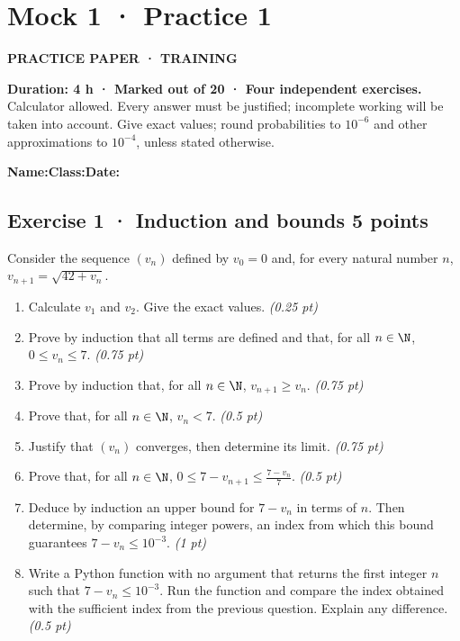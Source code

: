 \clearpage{}\label{sujet:5-1}

\section*{Mock 1 · Practice 1}

{\sffamily\bfseries\color{teal}PRACTICE PAPER · TRAINING\par}

\textbf{Duration: 4 h · Marked out of 20 · Four independent exercises.}\\Calculator allowed. Every answer must be justified; incomplete working will be taken into account. Give exact values; round probabilities to $10^{-6}$ and other approximations to $10^{-4}$, unless stated otherwise.

\smallskip\textbf{Name:}\enspace\dotfill\quad\textbf{Class:}\enspace\dotfill\quad\textbf{Date:}\enspace\dotfill

\subsection*{Exercise 1 · Induction and bounds \hfill 5 points}Consider the sequence $(v_n)$ defined by $v_0=0$ and, for every natural number $n$, $v_{n+1}=\sqrt{42+v_n}$.

\begin{enumerate}

\item Calculate $v_1$ and $v_2$. Give the exact values. \hfill\textit{(0.25 pt)}

\item Prove by induction that all terms are defined and that, for all $n\in\N$, $0\le v_n\le7$. \hfill\textit{(0.75 pt)}

\item Prove by induction that, for all $n\in\N$, $v_{n+1}\ge v_n$. \hfill\textit{(0.75 pt)}

\item Prove that, for all $n\in\N$, $v_n<7$. \hfill\textit{(0.5 pt)}

\item Justify that $(v_n)$ converges, then determine its limit. \hfill\textit{(0.75 pt)}

\item Prove that, for all $n\in\N$, $0\le 7-v_{n+1}\le\frac{7-v_n}{7}$. \hfill\textit{(0.5 pt)}

\item Deduce by induction an upper bound for $7-v_n$ in terms of $n$. Then determine, by comparing integer powers, an index from which this bound guarantees $7-v_n\le10^{-3}$. \hfill\textit{(1 pt)}

\item Write a Python function with no argument that returns the first integer $n$ such that $7-v_n\le10^{-3}$. Run the function and compare the index obtained with the sufficient index from the previous question. Explain any difference. \hfill\textit{(0.5 pt)}

\end{enumerate}

